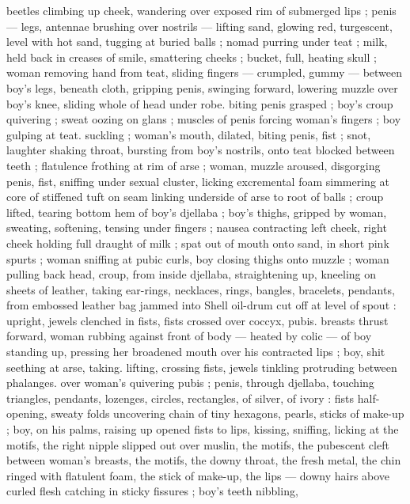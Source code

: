beetles climbing up cheek, wandering over exposed rim of 
submerged lips ; penis --- legs, antennae brushing over nostrils --- 
lifting sand, glowing red, turgescent, level with hot sand, tugging at 
buried balls ; nomad purring under teat ; milk, held back in creases 
of smile, smattering cheeks ; bucket, full, heating skull ; woman 
removing hand from teat, sliding fingers --- crumpled, gummy --- 
between boy's legs, beneath cloth, gripping penis, swinging forward, 
lowering muzzle over boy's knee, sliding whole of head under robe. 
biting penis grasped ; boy's croup quivering ; sweat oozing on glans 
; muscles of penis forcing woman's fingers ; boy gulping at teat. 
suckling ; woman's mouth, dilated, biting penis, fist ; snot, laughter 
shaking throat, bursting from boy's nostrils, onto teat blocked 
between teeth ; flatulence frothing at rim of arse ; woman, muzzle 
aroused, disgorging penis, fist, sniffing under sexual cluster, licking 
excremental foam simmering at core of stiffened tuft on seam linking 
underside of arse to root of balls ; croup lifted, tearing bottom hem 
of boy's djellaba ; boy's thighs, gripped by woman, sweating, 
softening, tensing under fingers ; nausea contracting left cheek, right 
cheek holding full draught of milk ; spat out of mouth onto sand, in 
short pink spurts ; woman sniffing at pubic curls, boy closing thighs 
onto muzzle ; woman pulling back head, croup, from inside djellaba, 
straightening up, kneeling on sheets of leather, taking ear-rings, 
necklaces, rings, bangles, bracelets, pendants, from embossed 
leather bag jammed into Shell oil-drum cut off at level of spout : 
upright, jewels clenched in fists, fists crossed over coccyx, pubis. 
breasts thrust forward, woman rubbing against front of body --- 
heated by colic --- of boy standing up, pressing her broadened 
mouth over his contracted lips ; boy, shit seething at arse, taking. 
lifting, crossing fists, jewels tinkling protruding between phalanges. 
over woman's quivering pubis ; penis, through djellaba, touching 
triangles, pendants, lozenges, circles, rectangles, of silver, of ivory : 
fists half-opening, sweaty folds uncovering chain of tiny hexagons, 
pearls, sticks of make-up ; boy, on his palms, raising up opened fists 
to lips, kissing, sniffing, licking at the motifs, the right nipple slipped 
out over muslin, the motifs, the pubescent cleft between woman's 
breasts, the motifs, the downy throat, the fresh metal, the chin ringed 
with flatulent foam, the stick of make-up, the lips --- downy hairs 
above curled flesh catching in sticky fissures ; boy's teeth nibbling, 
